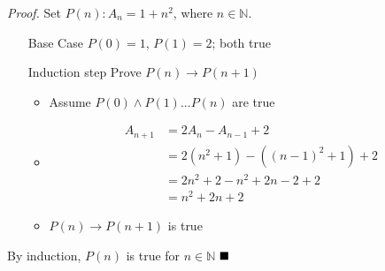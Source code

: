 \documentclass{article}
\def\math#1{$#1$}
\begin{document}
\textit{Proof.} Set \math{P(n): A_n = 1 + n^2}, where \math{n \in \mathbb{N}}.
\begin{itemize}
    \item [Base Case] \math{P(0) = 1}, \math{P(1) = 2}; both true
    \item [Induction step] Prove \math{P(n) \to P(n+1)}
        \begin{itemize}
            \item Assume \math{P(0) \land P(1) ... P(n)} are true
            \item \begin{equation}
                \begin{split}
                    A_{n+1} &= 2A_n - A_{n-1} + 2 \\
                    &= 2(n^2 + 1) - ({(n-1)}^2 + 1) + 2 \\
                    &= 2n^2 + 2 - n^2 + 2n - 2 + 2 \\
                    &= n^2 + 2n + 2
                \end{split}
            \end{equation}
            \item \math{P(n) \to P(n+1)} is true
        \end{itemize}
\end{itemize}

By induction, \math{P(n)} is true for \math{n \in \mathbb{N}} \math{\hfill{\blacksquare}}
\end{document}
